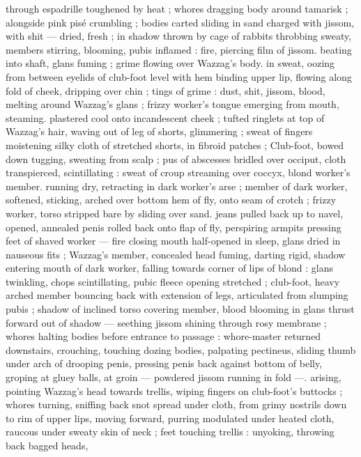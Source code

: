 through espadrille toughened by heat ; whores dragging body 
around tamarisk ; alongside pink pisé crumbling ; bodies carted 
sliding in sand charged with jissom, with shit --- dried, fresh ; in 
shadow thrown by cage of rabbits throbbing sweaty, members 
stirring, blooming, pubis inflamed : fire, piercing film of jissom. 
beating into shaft, glans fuming ; grime flowing over Wazzag's body. 
in sweat, oozing from between eyelids of club-foot level with hem 
binding upper lip, flowing along fold of cheek, dripping over chin ; 
tings of grime : dust, shit, jissom, blood, melting around Wazzag's 
glans ; frizzy worker's tongue emerging from mouth, steaming. 
plastered cool onto incandescent cheek ; tufted ringlets at top of 
Wazzag's hair, waving out of leg of shorts, glimmering ; sweat of 
fingers moistening silky cloth of stretched shorts, in fibroid patches 
; Club-foot, bowed down tugging, sweating from scalp ; pus of 
abscesses bridled over occiput, cloth transpierced, scintillating : 
sweat of croup streaming over coccyx, blond worker's member. 
running dry, retracting in dark worker's arse ; member of dark 
worker, softened, sticking, arched over bottom hem of fly, onto seam 
of crotch ; frizzy worker, torso stripped bare by sliding over sand. 
jeans pulled back up to navel, opened, annealed penis rolled back 
onto flap of fly, perspiring armpits pressing feet of shaved worker --- 
fire closing mouth half-opened in sleep, glans dried in nauseous fits 
; Wazzag's member, concealed head fuming, darting rigid, shadow 
entering mouth of dark worker, falling towards corner of lips of 
blond : glans twinkling, chops scintillating, pubic fleece opening 
stretched ; club-foot, heavy arched member bouncing back with 
extension of legs, articulated from slumping pubis ; shadow of 
inclined torso covering member, blood blooming in glans thrust 
forward out of shadow --- seething jissom shining through rosy 
membrane ; whores halting bodies before entrance to passage : 
whore-master returned downstairs, crouching, touching dozing 
bodies, palpating pectineus, sliding thumb under arch of drooping 
penis, pressing penis back against bottom of belly, groping at gluey 
balls, at groin --- powdered jissom running in fold ---. arising, 
pointing Wazzag's head towards trellis, wiping fingers on club-foot's 
buttocks ; whores turning, sniffing back snot spread under cloth, 
from grimy nostrils down to rim of upper lips, moving forward, 
purring modulated under heated cloth, raucous under sweaty skin of 
neck ; feet touching trellis : unyoking, throwing back bagged heads, 
